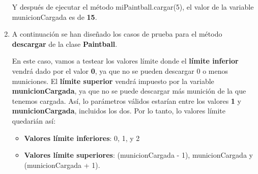 \begin{enumerate}
    Y después de ejecutar el método miPaintball.cargar(5), el valor de la variable municionCargada es de \textbf{15}.

    \item  A continuación se han diseñado los casos de prueba para el método \textbf{descargar} de la clase \textbf{Paintball}.

    En este caso, vamos a testear los valores límite donde el \textbf{límite inferior} vendrá dado por el valor \textbf{0}, ya que no se pueden descargar 0 o menos municiones. El \textbf{límite superior} vendrá impuesto por la variable \textbf{municionCargada}, ya que no se puede descargar más munición de la que tenemos cargada. Así, lo parámetros válidos estarían entre los valores \textbf{1} y \textbf{municionCargada}, incluidos los dos. Por lo tanto, lo valores límite quedarián así:

    \begin{itemize}
        \item \textbf{Valores límite inferiores}: 0, 1, y 2
        \item \textbf{Valores límite superiores}: (municionCargada - 1), municionCargada y (municionCargada + 1).
    \end{itemize}


\end{enumerate}

\newpage




